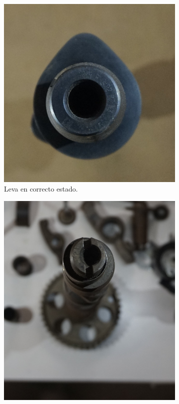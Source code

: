 \begin{figure}[H]
	\centering
	\begin{subfigure}[b]{0.45\textwidth}
		\centering
		\includegraphics[width=\linewidth]{Figures/01/m2/leva_nueva.jpg}
		\caption{Leva en correcto estado.}
		\label{fig:new_cam}
	\end{subfigure}
	\hfill
	\begin{subfigure}[b]{0.45\textwidth}
 		\centering
 		\includegraphics[width=\linewidth]{Figures/01/m2/leva_desgastada.jpg}

\end{subfigure}
\end{figure}
